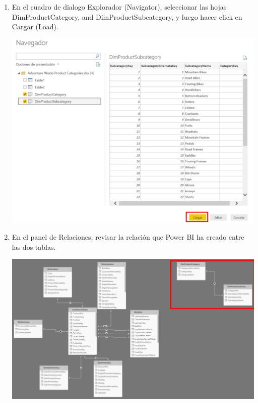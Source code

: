 \begin{itemize}
\begin{enumerate}
\item En el cuadro de dialogo Explorador (Navigator), seleccionar las hojas DimProductCategory, and DimProductSubcategory, y luego hacer click en Cargar (Load).
\begin{center}
\includegraphics[scale=0.55]{./Imagenes/b3.png}
\end{center}

\item En el panel de Relaciones, revisar la relación que Power BI ha creado entre las dos tablas.
\begin{center}
\includegraphics[scale=0.55]{./Imagenes/b4.png}
\end{center}


\end{enumerate}
\end{itemize}

